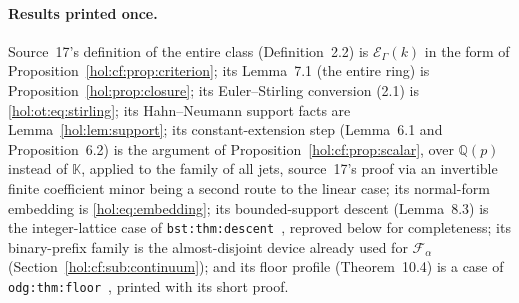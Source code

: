\documentclass[11pt]{article}
\numberwithin{equation}{section}
\theoremstyle{definition}
\theoremstyle{remark}
\newcommand{\Q}{\mathbb Q}
\newcommand{\KK}{\mathbb K}
\newcommand{\EK}{\mathcal E_\Gamma(k)}
\begin{document}
\paragraph{Results printed once.}
Source~17's definition of the entire class (Definition~2.2) is $\EK$ in the
form of Proposition~\ref{hol:cf:prop:criterion}; its Lemma~7.1 (the entire
ring) is Proposition~\ref{hol:prop:closure}; its Euler--Stirling conversion
(2.1) is \eqref{hol:ot:eq:stirling}; its Hahn--Neumann support facts are
Lemma~\ref{hol:lem:support}; its constant-extension step (Lemma~6.1 and
Proposition~6.2) is the argument of Proposition~\ref{hol:cf:prop:scalar},
over $\Q(p)$ instead of $\KK$, applied to the family of all jets, source~17's proof via an invertible finite coefficient
minor being a second route to the linear case; its normal-form embedding is
\eqref{hol:eq:embedding}; its bounded-support descent (Lemma~8.3) is the
integer-lattice case of \texttt{bst:thm:descent}~\cite{repobst}, reproved
below for completeness; its binary-prefix family is the almost-disjoint device
already used for $\mathcal F_\alpha$ (Section~\ref{hol:cf:sub:continuum}); and
its floor profile (Theorem~10.4) is a case of \texttt{odg:thm:floor}~\cite{repoodg},
printed with its short proof.
\end{document}
